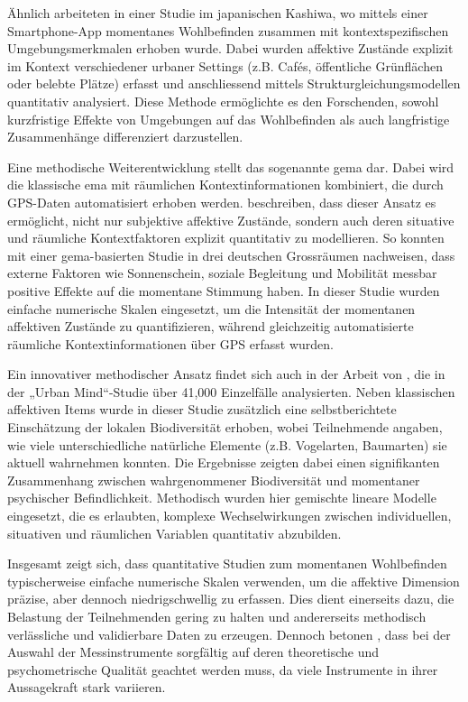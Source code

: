 Ähnlich arbeiteten \textcite{chenPerceivedUrbanEnvironment2025} in einer Studie im japanischen Kashiwa, wo mittels einer Smartphone-App momentanes Wohlbefinden zusammen mit kontextspezifischen Umgebungsmerkmalen erhoben wurde. Dabei wurden affektive Zustände explizit im Kontext verschiedener urbaner Settings (z.B. Cafés, öffentliche Grünflächen oder belebte Plätze) erfasst und anschliessend mittels Strukturgleichungsmodellen quantitativ analysiert. Diese Methode ermöglichte es den Forschenden, sowohl kurzfristige Effekte von Umgebungen auf das Wohlbefinden als auch langfristige Zusammenhänge differenziert darzustellen.

Eine methodische Weiterentwicklung stellt das sogenannte \acrfull{gema} dar. Dabei wird die klassische \acrshort{ema} mit räumlichen Kontextinformationen kombiniert, die durch GPS-Daten automatisiert erhoben werden. \textcite{kirchnerSpatiotemporalDeterminantsMental2016} beschreiben, dass dieser Ansatz es ermöglicht, nicht nur subjektive affektive Zustände, sondern auch deren situative und räumliche Kontextfaktoren explizit quantitativ zu modellieren. So konnten \textcite{mascherekMeadowsAsphaltRoad2025} mit einer \acrshort{gema}-basierten Studie in drei deutschen Grossräumen nachweisen, dass externe Faktoren wie Sonnenschein, soziale Begleitung und Mobilität messbar positive Effekte auf die momentane Stimmung haben. In dieser Studie wurden einfache numerische Skalen eingesetzt, um die Intensität der momentanen affektiven Zustände zu quantifizieren, während gleichzeitig automatisierte räumliche Kontextinformationen über GPS erfasst wurden.

Ein innovativer methodischer Ansatz findet sich auch in der Arbeit von \textcite{hammoudSmartphonebasedEcologicalMomentary2024}, die in der „Urban Mind“-Studie über 41,000 Einzelfälle analysierten. Neben klassischen affektiven Items wurde in dieser Studie zusätzlich eine selbstberichtete Einschätzung der lokalen Biodiversität erhoben, wobei Teilnehmende angaben, wie viele unterschiedliche natürliche Elemente (z.B. Vogelarten, Baumarten) sie aktuell wahrnehmen konnten. Die Ergebnisse zeigten dabei einen signifikanten Zusammenhang zwischen wahrgenommener Biodiversität und momentaner psychischer Befindlichkeit. Methodisch wurden hier gemischte lineare Modelle eingesetzt, die es erlaubten, komplexe Wechselwirkungen zwischen individuellen, situativen und räumlichen Variablen quantitativ abzubilden.

Insgesamt zeigt sich, dass quantitative Studien zum momentanen Wohlbefinden typischerweise einfache numerische Skalen verwenden, um die affektive Dimension präzise, aber dennoch niedrigschwellig zu erfassen. Dies dient einerseits dazu, die Belastung der Teilnehmenden gering zu halten und andererseits methodisch verlässliche und validierbare Daten zu erzeugen. Dennoch betonen \textcite{cookeMeasuringWellBeingReview2016}, dass bei der Auswahl der Messinstrumente sorgfältig auf deren theoretische und psychometrische Qualität geachtet werden muss, da viele Instrumente in ihrer Aussagekraft stark variieren.

